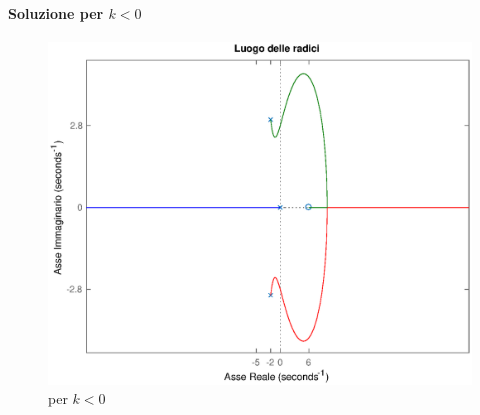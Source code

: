 \paragraph{Soluzione per \(k<0\)}

\begin{figure}
	\centering
	\includegraphics[scale=.5]{mod1/assets/rl_ex313n}
	\caption{per \(k<0\)}
\end{figure}

